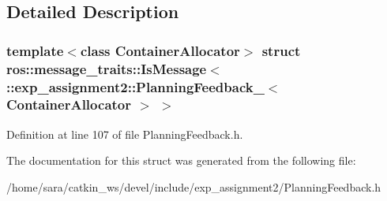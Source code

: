 \subsection{Detailed Description}
\subsubsection*{template$<$class Container\+Allocator$>$\newline
struct ros\+::message\+\_\+traits\+::\+Is\+Message$<$ \+::exp\+\_\+assignment2\+::\+Planning\+Feedback\+\_\+$<$ Container\+Allocator $>$ $>$}



Definition at line 107 of file Planning\+Feedback.\+h.



The documentation for this struct was generated from the following file\+:\begin{DoxyCompactItemize}
\item 
/home/sara/catkin\+\_\+ws/devel/include/exp\+\_\+assignment2/Planning\+Feedback.\+h\end{DoxyCompactItemize}
